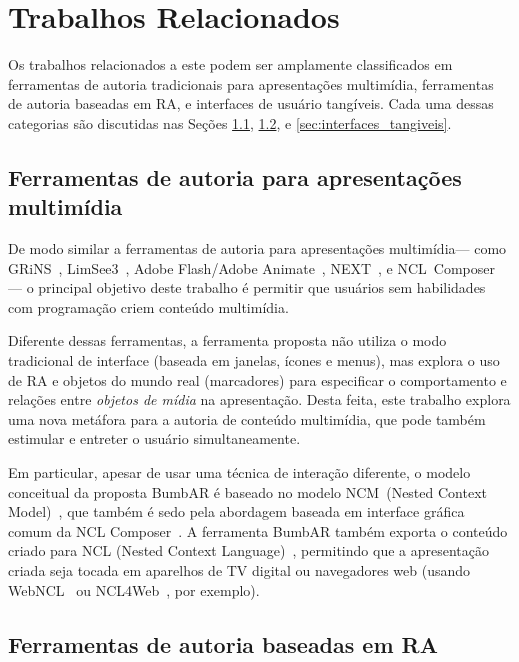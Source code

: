 \documentclass[../main.tex]{subfiles}
\begin{document}
\chapter{Trabalhos Relacionados}\label{cap:relacionados}

Os trabalhos relacionados a este podem ser amplamente classificados em ferramentas de autoria tradicionais para apresentações multimídia, ferramentas de autoria baseadas em RA, e interfaces de usuário tangíveis. Cada uma dessas categorias são discutidas nas Seções \ref{sec:ferramentas_multimidia}, \ref{sec:ferramentas_ra}, e \ref{sec:interfaces_tangiveis}.

\section{Ferramentas de autoria para apresentações multimídia}
\label{sec:ferramentas_multimidia}

De modo similar a ferramentas de autoria para apresentações multimídia--- como GRiNS~\cite{bulterman_grins_1998}, %
LimSee3~\cite{deltour_limsee3_2006}, %
Adobe Flash/Adobe Animate~\cite{adobe_animate_2017}, %
NEXT~\cite{paulo_de_mattos_next_2013}, %
e NCL~Composer~\cite{azevedo_composer_2014}%
--- o principal objetivo deste trabalho é permitir que usuários sem habilidades com programação criem conteúdo multimídia.

Diferente dessas ferramentas, a ferramenta proposta não utiliza o modo tradicional de interface (baseada em janelas, ícones e menus), mas explora o uso de RA e objetos do mundo real (marcadores) para especificar o comportamento e relações entre \emph{objetos de mídia} na apresentação. Desta feita, este trabalho explora uma nova metáfora para a autoria de conteúdo multimídia, que pode também estimular e entreter o usuário simultaneamente.

Em particular, apesar de usar uma técnica de interação diferente, o modelo conceitual da proposta BumbAR é baseado no modelo NCM~(Nested Context Model)~\cite{soares_nested_2005}, que também é sedo pela abordagem baseada em interface gráfica comum da NCL Composer~\cite{azevedo_composer_2014}. A ferramenta BumbAR também exporta o conteúdo criado para NCL (Nested Context Language)~\cite{soares_programando_2009}, permitindo que a apresentação criada seja tocada em aparelhos de TV digital ou navegadores web (usando WebNCL~\cite{melo_webncl_2012} ou NCL4Web~\cite{silva_ncl4web_2013}, por exemplo).

\section{Ferramentas de autoria baseadas em RA}
\label{sec:ferramentas_ra}
\end{document}
